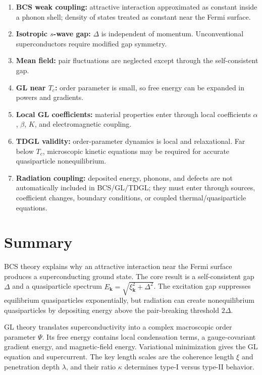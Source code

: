 \documentclass[11pt]{article}
\numberwithin{equation}{section}
\newcommand{\kvec}{\bm{k}}
\begin{document}
\begin{enumerate}[leftmargin=2em]
\item \textbf{BCS weak coupling:} attractive interaction approximated as constant inside a phonon shell; density of states treated as constant near the Fermi surface.
\item \textbf{Isotropic $s$-wave gap:} $\Delta$ is independent of momentum. Unconventional superconductors require modified gap symmetry.
\item \textbf{Mean field:} pair fluctuations are neglected except through the self-consistent gap.
\item \textbf{GL near $T_c$:} order parameter is small, so free energy can be expanded in powers and gradients.
\item \textbf{Local GL coefficients:} material properties enter through local coefficients $\alpha$, $\beta$, $K$, and electromagnetic coupling.
\item \textbf{TDGL validity:} order-parameter dynamics is local and relaxational. Far below $T_c$, microscopic kinetic equations may be required for accurate quasiparticle nonequilibrium.
\item \textbf{Radiation coupling:} deposited energy, phonons, and defects are not automatically included in BCS/GL/TDGL; they must enter through sources, coefficient changes, boundary conditions, or coupled thermal/quasiparticle equations.
\end{enumerate}

\section{Summary}

BCS theory explains why an attractive interaction near the Fermi surface produces a superconducting ground state. The core result is a self-consistent gap $\Delta$ and a quasiparticle spectrum $E_{\kvec}=\sqrt{\xi_{\kvec}^2+\Delta^2}$. The excitation gap suppresses equilibrium quasiparticles exponentially, but radiation can create nonequilibrium quasiparticles by depositing energy above the pair-breaking threshold $2\Delta$.

GL theory translates superconductivity into a complex macroscopic order parameter $\Psi$. Its free energy contains local condensation terms, a gauge-covariant gradient energy, and magnetic-field energy. Variational minimization gives the GL equation and supercurrent. The key length scales are the coherence length $\xi$ and penetration depth $\lambda$, and their ratio $\kappa$ determines type-I versus type-II behavior.
\end{document}
